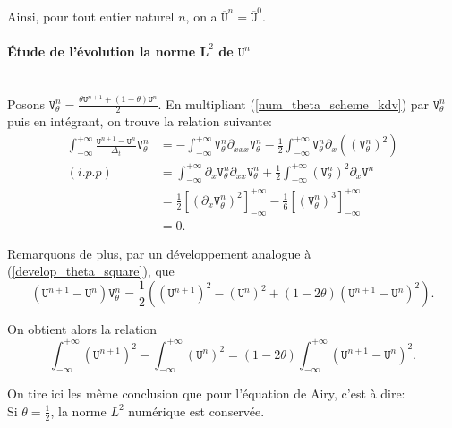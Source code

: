 \documentclass[12pt,a4paper]{article}
\numberwithin{equation}{section}
\begin{document}
Ainsi, pour tout entier naturel $n$, on a $\overline{\texttt{U}}^n = \overline{\texttt{U}}^0$.

\paragraph{Étude de l'évolution la norme $\textbf{L}^2$ de $\texttt{U}^n$}\,\\

Posons $\texttt{V}_\theta^n = \frac{\theta\texttt{U}^{n+1} + (1-\theta)\texttt{U}^{n}}{2}$. En multipliant (\ref{num_theta_scheme_kdv}) par $\texttt{V}^n_\theta$ puis en intégrant, on trouve la relation suivante:
\begin{equation*}
\begin{split}
    \int_{-\infty}^{+\infty}\frac{\texttt{U}^{n+1}-\texttt{U}^n}{\Delta_t}\texttt{V}_\theta^n
    &= -\int_{-\infty}^{+\infty} \texttt{V}_\theta^n\partial_{xxx} \texttt{V}_\theta^n  -\frac{1}{2}\int_{-\infty}^{+\infty} \texttt{V}_\theta^n\partial_{x}\left( \left(\texttt{V}_\theta^n\right)^2 \right) \\
    (i.p.p)~~&= \int_{-\infty}^{+\infty} \partial_{x}\texttt{V}_\theta^n\partial_{xx} \texttt{V}_\theta^n  + \frac{1}{2}\int_{-\infty}^{+\infty}  \left(\texttt{V}_\theta^n\right)^2\partial_{x} \texttt{V}^n  \\
    &= \frac{1}{2}\left[\left(\partial_{x}\texttt{V}_\theta^n\right)^2\right]_{-\infty}^{+\infty} -\frac{1}{6} \left[\left(\texttt{V}_\theta^n\right)^3 \right]_{-\infty}^{+\infty} \\
    & = 0 .
\end{split}
\end{equation*}

Remarquons de plus, par un développement analogue à (\ref{develop_theta_square}), que 
$$(\texttt{U}^{n+1}-\texttt{U}^n)\texttt{V}_\theta^n = \frac{1}{2}\left((\texttt{U}^{n+1})^2-(\texttt{U}^n)^2 + (1-2\theta)(\texttt{U}^{n+1}-\texttt{U}^{n})^2 \right).$$ 

On obtient alors la relation
\begin{equation}
    \int_{-\infty}^{+\infty}(\texttt{U}^{n+1})^2 - \int_{-\infty}^{+\infty}(\texttt{U}^{n})^2 = (1-2\theta) \int_{-\infty}^{+\infty}(\texttt{U}^{n+1}- \texttt{U}^{n})^2 .
\end{equation}

On tire ici les même conclusion que pour l'équation de Airy, c'est à dire:\\

Si $\theta = \frac{1}{2}$, la norme $L^2$ numérique est conservée.\\
\end{document}
